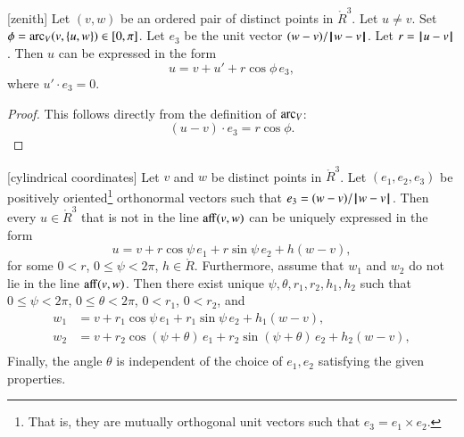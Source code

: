 \begin{lemma}[zenith]
Let $(v,w)$ be an ordered pair of distinct points in $\ring{R}^3$.
Let $u\ne v$.  Set $\phi = \operatorname{arc}_V(v,\{u,w\})\in[0,\pi]$.
Let $e_3$ be the unit vector $(w-v)/{\hskip0.1em|\hskip-0.15em|\hskip0.1em}w - v{\hskip0.1em|\hskip-0.15em|\hskip0.1em}$.  Let $r = {\hskip0.1em|\hskip-0.15em|\hskip0.1em}u - v{\hskip0.1em|\hskip-0.15em|\hskip0.1em}$.
Then $u$
can be expressed in the form
   $$
   u = v + u' +
   r\cos\phi\, e_3,
   $$
where $u'\cdot e_3 = 0$.
%
%
%
\end{lemma}

\begin{proof} This follows directly from the definition of $\operatorname{arc}_V$:
  $$(u-v)\cdot e_3 = r\cos\phi.$$
\end{proof}



\begin{lemma}[cylindrical coordinates]
Let $v$ and $w$ be distinct points in 
$\ring{R}^3$.  Let $(e_1,e_2,e_3)$ be positively oriented\footnote{That is, they are mutually orthogonal unit vectors such that $e_3 = e_1 \times e_2$.} orthonormal
vectors such that $e_3 = (w-v)/{\hskip0.1em|\hskip-0.15em|\hskip0.1em}w - v{\hskip0.1em|\hskip-0.15em|\hskip0.1em}$.
Then every
$u\in\ring{R}^3$ that is not in the line ${\operatorname{aff}}(v,w)$
can be uniquely expressed in the form
   $$
   u = v + r\cos\psi\, e_1 + r\sin\psi\, e_2 + h (w-v),
   $$
%
%
for some $0< r$, $0\le \psi < 2\pi$, $h\in\ring{R}$.
Furthermore,
assume that $w_1$ and $w_2$ do
not lie in the line ${\operatorname{aff}}(v,w)$.
Then there exist unique $\psi,\theta,r_1,r_2,h_1,h_2$
 such
that $0\le\psi<2\pi$, $0\le\theta < 2\pi$, $0 < r_1$, $0 < r_2$, and
  $$
  \begin{array}{lll}
    w_1 &= v + r_1\cos\psi\, e_1 + r_1\sin\psi\, e_2 + h_1(w-v),\\
    w_2 &= v + r_2\cos(\psi+\theta)\, e_1 + r_2\sin(\psi+\theta)\, e_2 
     + h_2(w-v),\\
\end{array}
  $$
Finally, the angle $\theta$ is independent of the choice of $e_1,e_2$
satisfying the given properties.
\end{lemma}
%
%
%
%
%
%

